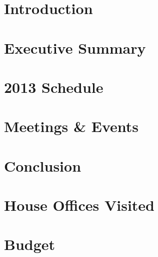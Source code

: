 \documentclass[12pt]{article}
\begin{document}


\newpage
\tableofcontents
\thispagestyle{empty}

\begin{doublespace}

\newpage
\setcounter{page}{1} 
\section{Introduction}


\newpage
\section{Executive Summary}


\newpage
\section{2013 Schedule}


\newpage
\section{Meetings \& Events}


\newpage
\section{Conclusion}


\appendix

\newpage
\section{House Offices Visited}\label{sec:house}


\newpage
\section{Budget}\label{sec:budget}





\end{doublespace}
\end{document}
